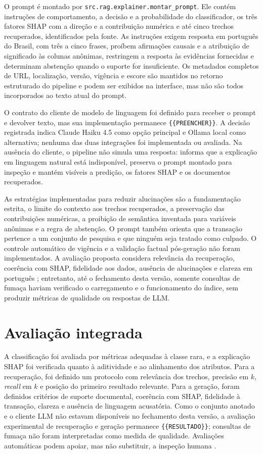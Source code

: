 O prompt é montado por \texttt{src.rag.explainer.montar\_prompt}. Ele contém instruções de comportamento, a decisão e a probabilidade do classificador, os três fatores SHAP com a direção e a contribuição numérica e até cinco trechos recuperados, identificados pela fonte. As instruções exigem resposta em português do Brasil, com três a cinco frases, proíbem afirmações causais e a atribuição de significado às colunas anônimas, restringem a resposta às evidências fornecidas e determinam abstenção quando o suporte for insuficiente. Os metadados completos de URL, localização, versão, vigência e escore são mantidos no retorno estruturado do pipeline e podem ser exibidos na interface, mas não são todos incorporados ao texto atual do prompt.

O contrato do cliente de modelo de linguagem foi definido para receber o prompt e devolver texto, mas sua implementação permanece \texttt{\{\{PREENCHER\}\}}. A decisão registrada indica Claude Haiku 4.5 como opção principal e Ollama local como alternativa; nenhuma das duas integrações foi implementada ou avaliada. Na ausência do cliente, o pipeline não simula uma resposta: informa que a explicação em linguagem natural está indisponível, preserva o prompt montado para inspeção e mantém visíveis a predição, os fatores SHAP e os documentos recuperados.

As estratégias implementadas para reduzir alucinações são a fundamentação estrita, o limite do contexto aos trechos recuperados, a preservação das contribuições numéricas, a proibição de semântica inventada para variáveis anônimas e a regra de abstenção. O prompt também orienta que a transação pertence a um conjunto de pesquisa e que ninguém seja tratado como culpado. O controle automático de vigência e a validação factual pós-geração não foram implementados. A avaliação proposta considera relevância da recuperação, coerência com SHAP, fidelidade aos dados, ausência de alucinações e clareza em português \cite{es2024ragas}; entretanto, até o fechamento desta versão, somente consultas de fumaça haviam verificado o carregamento e o funcionamento do índice, sem produzir métricas de qualidade ou respostas de LLM.

\section{Avaliação integrada}

A classificação foi avaliada por métricas adequadas à classe rara, e a explicação SHAP foi verificada quanto à aditividade e ao alinhamento dos atributos. Para a recuperação, foi definido um protocolo com relevância dos trechos, precisão em $k$, \emph{recall} em $k$ e posição do primeiro resultado relevante. Para a geração, foram definidos critérios de suporte documental, coerência com SHAP, fidelidade à transação, clareza e ausência de linguagem acusatória. Como o conjunto anotado e o cliente LLM não estavam disponíveis no fechamento desta versão, a avaliação experimental de recuperação e geração permanece \texttt{\{\{RESULTADO\}\}}; consultas de fumaça não foram interpretadas como medida de qualidade. Avaliações automáticas podem apoiar, mas não substituir, a inspeção humana \cite{es2024ragas}.

